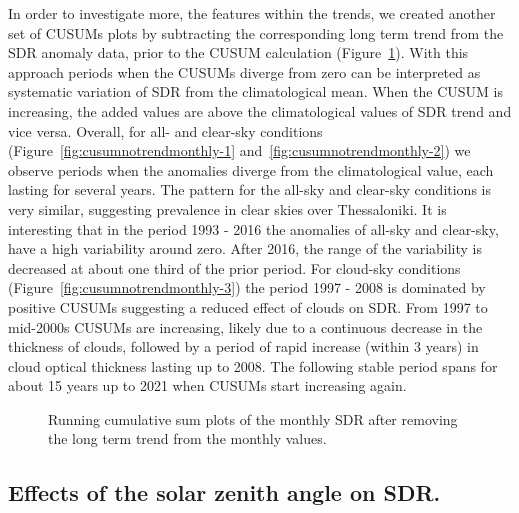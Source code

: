 \documentclass[applsci,article,submit,moreauthors,pdftex]{Definitions/mdpi}
\begin{document}
In order to investigate more, the features within the trends, we created
another set of CUSUMs plots by subtracting the corresponding long term
trend from the SDR anomaly data, prior to the CUSUM calculation
(Figure~\ref{fig:cusumnotrendmonthly}). With this approach periods when
the CUSUMs diverge from zero can be interpreted as systematic variation
of SDR from the climatological mean. When the CUSUM is increasing, the
added values are above the climatological values of SDR trend and vice
versa. Overall, for all- and clear-sky conditions
(Figure~\ref{fig:cusumnotrendmonthly-1}
and~\ref{fig:cusumnotrendmonthly-2}) we observe periods when the
anomalies diverge from the climatological value, each lasting for
several years. The pattern for the all-sky and clear-sky conditions is
very similar, suggesting prevalence in clear skies over Thessaloniki. It
is interesting that in the period 1993 - 2016 the anomalies of all-sky
and clear-sky, have a high variability around zero. After 2016, the
range of the variability is decreased at about one third of the prior
period. For cloud-sky conditions
(Figure~\ref{fig:cusumnotrendmonthly-3}) the period 1997 - 2008 is
dominated by positive CUSUMs suggesting a reduced effect of clouds on
SDR. From 1997 to mid-2000s CUSUMs are increasing, likely due to a
continuous decrease in the thickness of clouds, followed by a period of
rapid increase (within 3 years) in cloud optical thickness lasting up to
2008. The following stable period spans for about 15 years up to 2021
when CUSUMs start increasing again.

\begin{figure}[h!]

{\centering {}

}

\caption{Running cumulative sum plots of the monthly SDR after removing the long term trend from the monthly values.}\label{fig:cusumnotrendmonthly}
\end{figure}

\hypertarget{effects-of-the-solar-zenith-angle-on-sdr.}{%
\subsection{Effects of the solar zenith angle on
SDR.}\label{effects-of-the-solar-zenith-angle-on-sdr.}}
\end{document}
